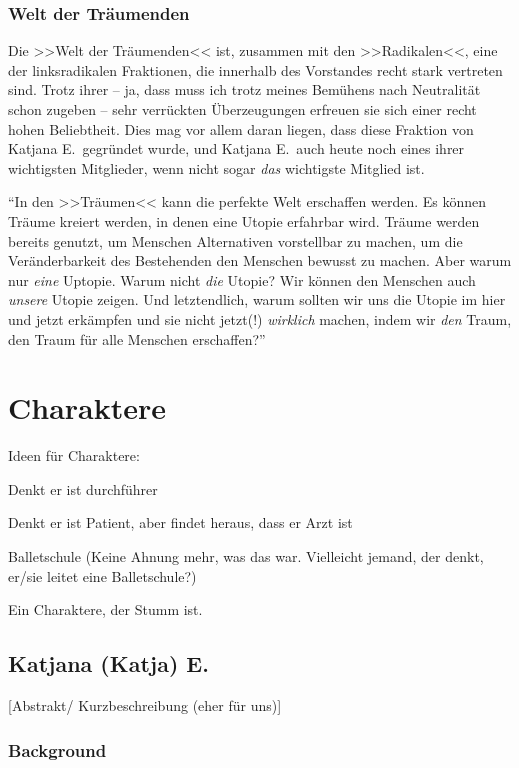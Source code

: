 \documentclass[12pt, a4paper, openany]{report}
\let\tempone\itemize
\let\temptwo\enditemize
\renewenvironment{itemize}{\tempone\addtolength{\itemsep}{-0.5\baselineskip}}{\temptwo}
\begin{document}
\subsubsection{Welt der Träumenden}
Die >>Welt der Träumenden<< ist, zusammen mit den >>Radikalen<<, eine der linksradikalen Fraktionen, die innerhalb des Vorstandes recht stark vertreten sind. 
Trotz ihrer -- ja, dass muss ich trotz meines Bemühens nach Neutralität schon zugeben -- sehr verrückten Überzeugungen erfreuen sie sich einer recht hohen Beliebtheit.
Dies mag vor allem daran liegen, dass diese Fraktion von Katjana E.~gegründet wurde, und Katjana E.~auch heute noch eines ihrer wichtigsten Mitglieder, wenn nicht sogar \emph{das} wichtigste Mitglied ist.

``In den >>Träumen<< kann die perfekte Welt erschaffen werden. 
Es können Träume kreiert werden, in denen eine Utopie erfahrbar wird. 
Träume werden bereits genutzt, um Menschen Alternativen vorstellbar zu machen,
um die Veränderbarkeit des Bestehenden den Menschen bewusst zu machen.
Aber warum nur \emph{eine} Uptopie. 
Warum nicht \emph{die} Utopie?
Wir können den Menschen auch \emph{unsere} Utopie zeigen.
Und letztendlich, warum sollten wir uns die Utopie im hier und jetzt erkämpfen
und sie nicht jetzt(!) \emph{wirklich} machen, indem wir \emph{den} Traum, den
Traum für alle Menschen erschaffen?''\\ 

\section{Charaktere}
Ideen für Charaktere:
\begin{itemize}
\item Denkt er ist durchführer
\item Denkt er ist Patient, aber findet heraus, dass er Arzt ist
\item Balletschule (Keine Ahnung mehr, was das war. Vielleicht jemand, der denkt, er/sie leitet eine Balletschule?)
\item Ein Charaktere, der Stumm ist.
\end{itemize}

\subsection{Katjana (Katja) E.}
[Abstrakt/ Kurzbeschreibung (eher für uns)]
\subsubsection{Background}
\end{document}

